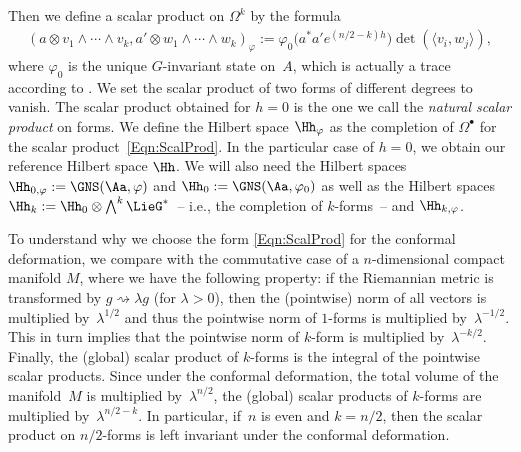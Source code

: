 Then we def\/ine a scalar product on $\Omega^k$ by the formula
\begin{gather}
\label{Eqn:ScalProd}
(a \otimes v_1 \wedge \cdots \wedge v_k, a' \otimes w_1 \wedge \cdots \wedge w_k )_\varphi := \varphi_0\big( a^* a' e^{(n/2-k)h}\big) \det( \langle v_i, w_j \rangle ),
\end{gather}
where $\varphi_0$ is the unique $G$-invariant state on~$A$, which is actually a trace according to \cite[Theorem~3.1, p.~8]{ErgodActAHK}. We set the scalar product of two forms of dif\/ferent degrees to vanish. The scalar product obtained for $h = 0$ is the one we call the \emph{natural scalar product} on forms. We def\/ine the Hilbert space $\Hh_\varphi$ as the completion of $\Omega^\bullet$ for the scalar product~\eqref{Eqn:ScalProd}. In the particular case of $h = 0$, we obtain our reference Hilbert space $\Hh$. We will also need the Hilbert spaces $\Hh_{0, \varphi} := \GNS(\Aa, \varphi)$ and $\Hh_{0} := \GNS(\Aa, \varphi_0)$ as well as the Hilbert spaces $\Hh_k := \Hh_0 \otimes \bigwedge^k \LieG^*$~-- i.e., the completion of $k$-forms~-- and $\Hh_{k, \varphi}$.

To understand why we choose the form \eqref{Eqn:ScalProd} for the conformal deformation, we compare with the commutative case of a $n$-dimensional compact manifold $M$, where we have the following property: if the Riemannian metric is transformed by $g \rightsquigarrow \lambda g$ (for $\lambda > 0$), then the (pointwise) norm of all vectors is multiplied by~$\lambda^{1/2}$ and thus the pointwise norm of $1$-forms is multiplied by~$\lambda^{-1/2}$. This in turn implies that the pointwise norm of $k$-form is multiplied by~$\lambda^{-k/2}$. Finally, the (global) scalar product of $k$-forms is the integral of the pointwise scalar products. Since under the conformal deformation, the total volume of the manifold~$M$ is multiplied by~$\lambda^{n/2}$, the (global) scalar products of $k$-forms are multiplied by~$\lambda^{n/2-k}$. In particular, if~$n$ is even and $k = n/2$, then the scalar product on $n/2$-forms is left invariant under the conformal deformation.


